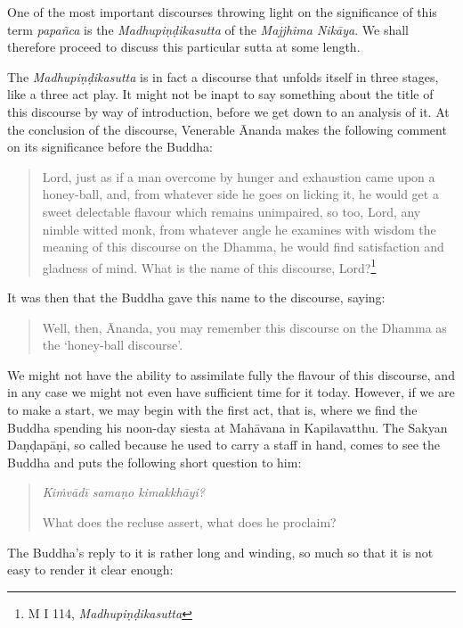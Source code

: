 One of the most important discourses throwing light on the significance of this term \emph{papañca} is the \emph{Madhupiṇḍikasutta} of the \emph{Majjhima Nikāya}. We shall therefore proceed to discuss this particular sutta at some length.

The \emph{Madhupiṇḍikasutta} is in fact a discourse that unfolds itself in three stages, like a three act play. It might not be inapt to say something about the title of this discourse by way of introduction, before we get down to an analysis of it. At the conclusion of the discourse, Venerable Ānanda makes the following comment on its significance before the Buddha:

\begin{quote}
Lord, just as if a man overcome by hunger and exhaustion came upon a honey-ball, and, from whatever side he goes on licking it, he would get a sweet delectable flavour which remains unimpaired, so too, Lord, any nimble witted monk, from whatever angle he examines with wisdom the meaning of this discourse on the Dhamma, he would find satisfaction and gladness of mind. What is the name of this discourse, Lord?\footnote{M I 114, \emph{Madhupiṇḍikasutta}}
\end{quote}

It was then that the Buddha gave this name to the discourse, saying:

\begin{quote}
Well, then, Ānanda, you may remember this discourse on the Dhamma as the `honey-ball discourse'.
\end{quote}

We might not have the ability to assimilate fully the flavour of this discourse, and in any case we might not even have sufficient time for it today. However, if we are to make a start, we may begin with the first act, that is, where we find the Buddha spending his noon-day siesta at Mahāvana in Kapilavatthu. The Sakyan Daṇḍapāṇi, so called because he used to carry a staff in hand, comes to see the Buddha and puts the following short question to him:

\clearpage

\begin{quote}
\emph{Kiṁvādī samaṇo kimakkhāyi?}

What does the recluse assert, what does he proclaim?
\end{quote}

The Buddha's reply to it is rather long and winding, so much so that it is not easy to render it clear enough:

